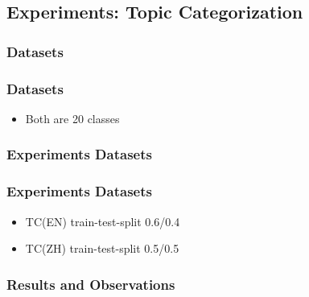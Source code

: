\documentclass[mathserif]{beamer}
\begin{document}
\subsection{Experiments: Topic Categorization}
\subsubsection{Datasets}
\begin{frame}
\frametitle{Datasets}
	\begin{itemize}
	\item Both are 20 classes
	\end{itemize}

\subsubsection{Experiments Datasets}
\end{frame}
\begin{frame}
\frametitle{Experiments Datasets}
	\begin{itemize}
	\item TC(EN) train-test-split 0.6/0.4
	\item TC(ZH) train-test-split 0.5/0.5
	\end{itemize}

\end{frame}
\subsubsection{Results and Observations}
\end{document}
